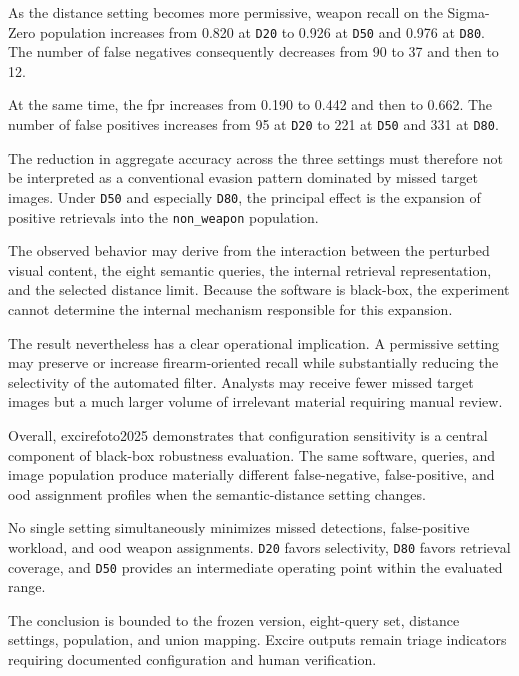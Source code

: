 As the distance setting becomes more permissive, weapon recall on the
Sigma-Zero population increases from 0.820 at \texttt{D20} to 0.926 at
\texttt{D50} and 0.976 at \texttt{D80}. The number of false negatives
consequently decreases from 90 to 37 and then to 12.

At the same time, the \gls{fpr} increases from 0.190 to 0.442 and then to
0.662. The number of false positives increases from 95 at \texttt{D20} to 221
at \texttt{D50} and 331 at \texttt{D80}.

The reduction in aggregate accuracy across the three settings must therefore
not be interpreted as a conventional evasion pattern dominated by missed
target images. Under \texttt{D50} and especially \texttt{D80}, the principal
effect is the expansion of positive retrievals into the
\texttt{non\_weapon} population.

The observed behavior may derive from the interaction between the perturbed
visual content, the eight semantic queries, the internal retrieval
representation, and the selected distance limit. Because the software is
black-box, the experiment cannot determine the internal mechanism responsible
for this expansion.

The result nevertheless has a clear operational implication. A permissive
setting may preserve or increase firearm-oriented recall while substantially
reducing the selectivity of the automated filter. Analysts may receive fewer
missed target images but a much larger volume of irrelevant material requiring
manual review.

Overall, \gls{excirefoto2025} demonstrates that configuration sensitivity is a
central component of black-box robustness evaluation. The same software,
queries, and image population produce materially different false-negative,
false-positive, and \gls{ood} assignment profiles when the semantic-distance
setting changes.

No single setting simultaneously minimizes missed detections, false-positive
workload, and \gls{ood} weapon assignments. \texttt{D20} favors selectivity,
\texttt{D80} favors retrieval coverage, and \texttt{D50} provides an
intermediate operating point within the evaluated range.

The conclusion is bounded to the frozen version, eight-query set, distance
settings, population, and union mapping. Excire outputs remain triage
indicators requiring documented configuration and human verification.


